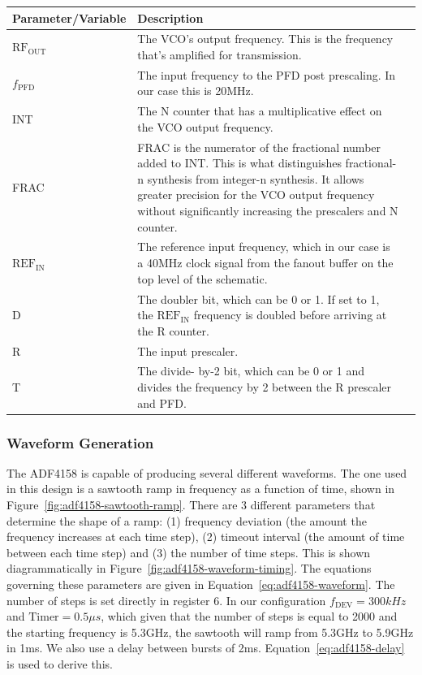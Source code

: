 \label{tab:adf4158-rfout-equation-vars}
\begin{tabularx}{\textwidth}{l X>{\raggedright\arraybackslash}X}
        \toprule
        \textbf{Parameter/Variable} & \textbf{Description} \\
        \midrule
        \endhead{}

        $\text{RF}_{\text{OUT}}$ & The VCO's output frequency. This is the frequency that's amplified for
        transmission. \\
        $f_{\text{PFD}}$ & The input frequency to the PFD post prescaling. In our case this is 20MHz. \\
        INT & The N counter that has a multiplicative effect on the VCO output frequency. \\
        FRAC & FRAC is the numerator of the fractional number added to INT. This is what distinguishes
        fractional-n synthesis from integer-n synthesis. It allows greater precision for the VCO
        output frequency without significantly increasing the prescalers and N counter. \\
        $\text{REF}_{\text{IN}} $ & The reference input frequency, which in our case is a 40MHz clock
        signal from the fanout buffer on the top level of the schematic. \\
        D & The doubler bit, which can be 0 or 1. If set to 1, the $\text{REF}_{\text{IN}}$ frequency is
        doubled before arriving at the R counter. \\
        R & The input prescaler. \\
        T & The divide- by-2 bit, which can be 0 or 1 and divides the frequency by 2 between the R
        prescaler and PFD. \\

        \bottomrule
\end{tabularx}

\subsubsection{Waveform Generation}
\label{sec:adf4158-waveform-generation}

The ADF4158 is capable of producing several different waveforms. The one used in this design is a
sawtooth ramp in frequency as a function of time, shown in
Figure~\ref{fig:adf4158-sawtooth-ramp}. There are 3 different parameters that determine the shape of
a ramp: (1) frequency deviation (the amount the frequency increases at each time step), (2) timeout
interval (the amount of time between each time step) and (3) the number of time steps. This is shown
diagrammatically in Figure~\ref{fig:adf4158-waveform-timing}. The equations governing these
parameters are given in Equation~\ref{eq:adf4158-waveform}. The number of steps is set directly in
register 6. In our configuration $f_{\text{DEV}} = 300\si{kHz}$ and $\text{Timer} = 0.5\si{\mu s}$,
which given that the number of steps is equal to 2000 and the starting frequency is 5.3GHz, the
sawtooth will ramp from 5.3GHz to 5.9GHz in 1ms. We also use a delay between bursts of
2ms. Equation~\ref{eq:adf4158-delay} is used to derive this.

